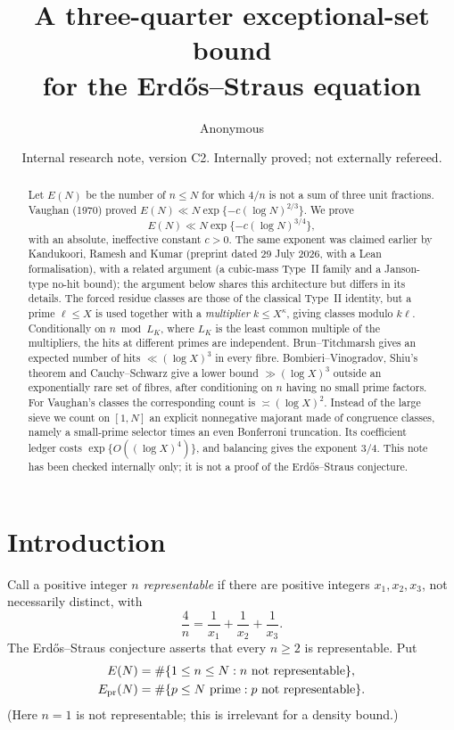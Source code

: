 \documentclass[10pt,reqno]{amsart}
\title[A three-quarter exceptional-set bound for Erd\H{o}s--Straus]{A three-quarter exceptional-set bound\\ for the Erd\H{o}s--Straus equation}
\author{Anonymous}
\date{Internal research note, version C2. Internally proved; not externally refereed.}
\theoremstyle{remark}
\begin{document}
\begin{abstract}
Let $E(N)$ be the number of $n\leq N$ for which $4/n$ is not a sum of three
unit fractions.  Vaughan (1970) proved $E(N)\ll N\exp\{-c(\log N)^{2/3}\}$.
We prove
\[
 E(N)\ll N\exp\{-c(\log N)^{3/4}\},
\]
with an absolute, ineffective constant $c>0$.  The same exponent was
claimed earlier by Kandukoori, Ramesh and Kumar
\cite{KRK} (preprint dated 29 July 2026, with a Lean formalisation), with a
related argument (a cubic-mass Type~II family and a Janson-type no-hit
bound); the argument below shares this architecture but differs in its
details.  The forced residue classes are
those of the classical Type~II identity, but a prime $\ell\leq X$ is used
together with a \emph{multiplier} $k\leq X^\kappa$, giving classes modulo
$k\ell$.
Conditionally on $n\bmod L_K$, where $L_K$ is the least common multiple of
the multipliers, the hits at different primes are independent.
Brun--Titchmarsh gives an expected number of hits $\ll(\log X)^3$ in every
fibre.  Bombieri--Vinogradov, Shiu's theorem and Cauchy--Schwarz give a
lower bound $\gg(\log X)^3$ outside an exponentially rare set of fibres,
after conditioning on $n$ having no small prime factors.  For Vaughan's
classes the corresponding count is
$\asymp(\log X)^2$.  Instead of
the large sieve we count on $[1,N]$ an explicit nonnegative majorant made
of congruence classes, namely a small-prime selector times an even
Bonferroni truncation.  Its coefficient ledger costs
$\exp\{O((\log X)^4)\}$, and balancing gives the exponent $3/4$.  This note
has been checked internally only; it is not a proof of the Erd\H{o}s--Straus
conjecture.
\end{abstract}
\maketitle

\section{Introduction}\label{sec:intro}
Call a positive integer $n$ \emph{representable} if there are positive
integers $x_1,x_2,x_3$, not necessarily distinct, with
\begin{equation}\label{eq:ES}
 \frac4n=\frac1{x_1}+\frac1{x_2}+\frac1{x_3}.
\end{equation}
The Erd\H{o}s--Straus conjecture asserts that every $n\geq2$ is
representable.  Put
\[
 \begin{aligned}
 E(N)&=\#\{1\leq n\leq N:n\text{ not representable}\},\\
 E_{\rm pr}(N)&=\#\{p\leq N\text{ prime}:p\text{ not representable}\}.
 \end{aligned}
\]
(Here $n=1$ is not representable; this is irrelevant for a density bound.)
\end{document}
